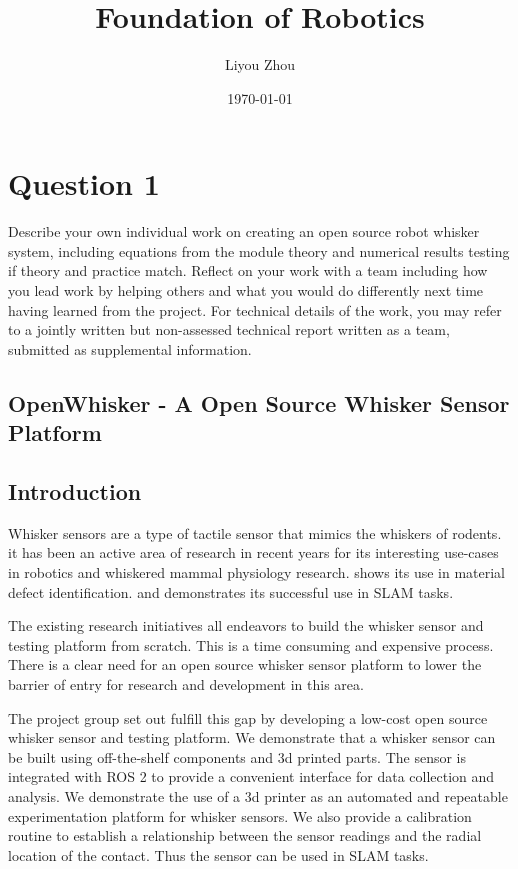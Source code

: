 \documentclass{report}
\title{Foundation of Robotics}
\author{Liyou Zhou}
\date{\today}
\begin{document}
\maketitle
\tableofcontents

\chapter{Question 1}

Describe your own individual work on creating an open source robot whisker system, including equations
from the module theory and numerical results testing if theory and practice match. Reflect on your work with
a team including how you lead work by helping others and what you would do differently next time having
learned from the project. For technical details of the work, you may refer to a jointly written but non-assessed
technical report written as a team, submitted as supplemental information.

\section{OpenWhisker - A Open Source Whisker Sensor Platform}

\section{Introduction}

Whisker sensors are a type of tactile sensor that mimics the whiskers of rodents. it has been an active area of research in recent years for its interesting use-cases in robotics and whiskered mammal physiology research\cite{prescottActiveTouchSensing2020}. \cite{fotouhiDetectionBarelyVisible2021} shows its use in material defect identification. \cite{struckmeierViTaSLAMBioinspiredVisuoTactile2019} and \cite{foxTactileSLAMBiomimetic2012} demonstrates its successful use in SLAM tasks.

The existing research initiatives all endeavors to build the whisker sensor and testing platform from scratch. This is a time consuming and expensive process. There is a clear need for an open source whisker sensor platform to lower the barrier of entry for research and development in this area.

The project group set out fulfill this gap by developing a low-cost open source whisker sensor and testing platform. We demonstrate that a whisker sensor can be built using off-the-shelf components and 3d printed parts. The sensor is integrated with ROS 2 to provide a convenient interface for data collection and analysis. We demonstrate the use of a 3d printer as an automated and repeatable experimentation platform for whisker sensors. We also provide a calibration routine to establish a relationship between the sensor readings and the radial location of the contact. Thus the sensor can be used in SLAM tasks.
\end{document}
